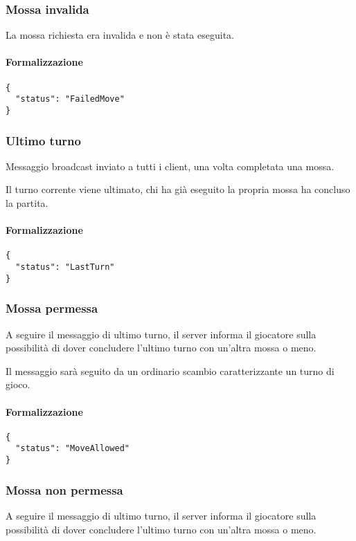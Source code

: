 \documentclass[a4paper,11pt]{article} %
\begin{document}
    \subsubsection{Mossa invalida}
    La mossa richiesta era invalida e non è stata eseguita.

    \paragraph{Formalizzazione}
    \begin{verbatim}
{
  "status": "FailedMove"
}
    \end{verbatim}

    \subsubsection{Ultimo turno}
    Messaggio broadcast inviato a tutti i client, una volta completata una mossa.

    Il turno corrente viene ultimato, chi ha già eseguito la propria mossa ha concluso la partita.

    \paragraph{Formalizzazione}
    \begin{verbatim}
{
  "status": "LastTurn"
}
    \end{verbatim}

    \subsubsection{Mossa permessa}
    A seguire il messaggio di ultimo turno, il server informa il giocatore sulla possibilità di dover concludere l'ultimo turno con un'altra mossa o meno.

    Il messaggio sarà seguito da un ordinario scambio caratterizzante un turno di gioco.

    \paragraph{Formalizzazione}
    \begin{verbatim}
{
  "status": "MoveAllowed"
}
    \end{verbatim}

    \subsubsection{Mossa non permessa}
    A seguire il messaggio di ultimo turno, il server informa il giocatore sulla possibilità di dover concludere l'ultimo turno con un'altra mossa o meno.
\end{document}
